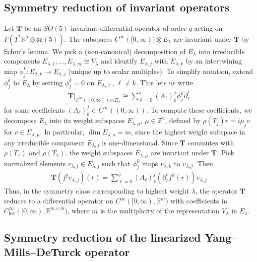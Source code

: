 \documentclass[11pt,reqno]{amsart}
\theoremstyle{remark}
\newcommand{\R}{\mathbb{R}}
\theoremstyle{definition}
\newcommand{\sov}{\mathfrak{so}(5)}
\begin{document}
\subsection{Symmetry reduction of invariant operators}
Let $\mathbf T$ be an $SO(5)$-invariant differential operator of order $q$ acting on $\Gamma(T^\ast \R^5 \otimes \sov)$. The subspaces $C^\infty([0,\infty)) \otimes E_\lambda$ are invariant under $\mathbf T$ by Schur's lemma. We pick a (non-canonical) decomposition of $E_\lambda$ into irreducible components $E_{\lambda,1},\ldots,E_{\lambda,m} \cong V_\lambda$ and identify $E_{\lambda,j}$ with $E_{\lambda,k}$ by an intertwining map $\phi^{k}_j: E_{\lambda,k} \to E_{\lambda,j}$ (unique up to scalar multiples). To simplify notation, extend $\phi^{k}_j$ to $E_\lambda$ by setting $\phi^{k}_j = 0$ on $E_{\lambda,\ell}$, $\ell \neq k$. This lets us write
\begin{align*}
    \mathbf T|_{C^\infty((0,\infty)) \otimes E_\lambda} \cong \sum_{\ell=0}^q (A_\ell)^j_k \phi^{k}_j \partial_r^\ell
\end{align*}
for some coefficients $(A_\ell)^j_k \in C^\infty((0,\infty))$. To compute these coefficients, we decompose $E_\lambda$ into its weight subspaces $E_{\lambda,\mu}$, $\mu \in \mathbb Z^2$, defined by $\rho(T_j) v = i \mu_j v$ for $v \in E_{\lambda,\mu}$. In particular, $\dim E_{\lambda,\lambda} = m$, since the highest weight subspace in any irreducible component $E_{\lambda,j}$ is one-dimensional. Since $\mathbf T$ commutes with $\rho(T_1)$ and $\rho(T_2)$, the weight subspaces $E_{\lambda,\mu}$ are invariant under $\mathbf T$. Pick normalized elements $v_{\lambda,j} \in E_{\lambda,j}$ such that $\phi^k_j$ maps $v_{\lambda,k}$ to $v_{\lambda,j}$. Then
\begin{align*}
    \mathbf T (f^j v_{\lambda,j})(r) = \sum_{\ell=0}^q (A_\ell)^j_k (\partial_r^\ell f^k(r)) v_{\lambda,j}
\end{align*}
Thus, in the symmetry class corresponding to highest weight $\lambda$, the operator $\mathbf T$ reduces to a differential operator on $C^\infty([0,\infty),\mathbb R^m)$ with coefficients in $C^\infty_{\mathrm{loc}}([0,\infty),\mathbb R^{m \times m})$, where $m$ is the multiplicity of the representation $V_\lambda$ in $E_\lambda$.

\subsection{Symmetry reduction of the linearized Yang--Mills--DeTurck operator}
\label{sec:symmetry_reduction_specific}
\end{document}
